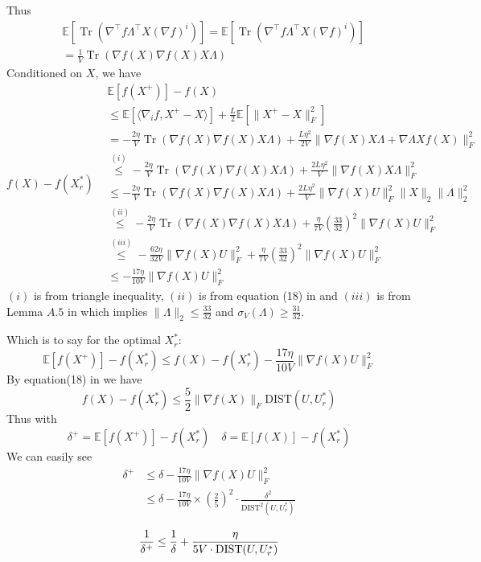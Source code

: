 \documentclass[letterpaper]{article} %
\DeclareMathOperator{\Tr}{Tr} %
\begin{document}
Thus 
\begin{equation}
\begin{split}
&\mathbb{E}[\Tr(\nabla^\top f\Lambda^\top X(\nabla f)^i)]=\mathbb{E}[\Tr(\nabla^\top f\Lambda^\top X(\nabla f)^i)]\\
&=\frac{1}{V} \Tr(\nabla f(X)\nabla f(X)X\Lambda)
\end{split}
\end{equation}
Conditioned on $X$, we have
\begin{equation}
f(X)-f(X_r^*)\begin{split}
&\mathbb{E}[f(X^+)]-f(X)\\&\le \mathbb{E}[\langle\nabla_i f, X^+-X \rangle]+\frac{L}{2}\mathbb{E}[\|X^+-X\|_F^2] \\
&=-\frac{2\eta}{V}\Tr(\nabla f(X)\nabla f(X)X\Lambda)+\frac{L\eta^2}{2V}\|\nabla f(X)X\Lambda+\nabla \Lambda Xf(X)\|^2_F\\
&\overset{(i)}{\le}-\frac{2\eta}{V}\Tr(\nabla f(X)\nabla f(X)X\Lambda)+\frac{2L\eta^2}{V}\|\nabla f(X)X\Lambda\|^2_F\\
&\le-\frac{2\eta}{V}\Tr(\nabla f(X)\nabla f(X)X\Lambda)+\frac{2L\eta^2}{V}\|\nabla f(X)U\|^2_F\|X\|_2\|\Lambda\|^2_2\\
&\overset{(ii)}{\le}-\frac{2\eta}{V}\Tr(\nabla f(X)\nabla f(X)X\Lambda)+\frac{\eta}{7V}(\frac{33}{32})^2\|\nabla f(X)U\|^2_F\\
&\overset{(iii)}{\le}-\frac{62\eta}{32V}\|\nabla f(X)U\|^2_F+\frac{\eta}{7V}(\frac{33}{32})^2\|\nabla f(X)U\|^2_F\\
&\le-\frac{17\eta}{10V}\|\nabla f(X)U\|^2_F
\end{split}
\end{equation}
$(i)$ is from triangle inequality, $(ii)$ is from equation (18) in \cite{park2016finding} and $(iii)$ is from Lemma $A.5$ in \cite{park2016finding} which implies $\|\Lambda\|_2\le \frac{33}{32}$ and $\sigma_V(\Lambda)\ge \frac{31}{32}$.

Which is to say for the optimal $X_r^*$:
\begin{equation}
 \mathbb{E}[f(X^+)]-f(X_r^*)\le f(X)-f(X_r^*)-\frac{17\eta}{10V}\|\nabla f(X)U\|^2_F
\label{eq: sublinear}
\end{equation}
By equation(18) in \cite{tu2015low} we have 
\begin{equation}
f(X)-f(X_r^*)\le\frac{5}{2}\|\nabla f(X)\|_F\text{DIST}(U,U^*_r) \label{eq:distance}
\end{equation}
Thus with 
$$\delta^+= \mathbb{E}[f(X^+)]-f(X_r^*)\quad \delta=\mathbb{E}[f(X)]-f(X_r^*)$$
We can easily see
\begin{equation}
\begin{split}
\delta^+&\le\delta -\frac{17\eta}{10V}\|\nabla f(X)U\|^2_F\\
&\le\delta -\frac{17\eta}{10V}\times(\frac{2}{5})^2\cdot\frac{\delta^2}{\text{DIST}^2(U,U^*_r)}\\
\end{split}
\end{equation}
\begin{equation}
\frac{1}{\delta^+}\le\frac{1}{\delta}+ \frac{\eta}{5V\cdot\text{DIST}(U,U^*_r)}\\
\end{equation}
\end{document}
